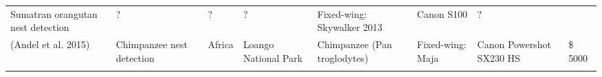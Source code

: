 \documentclass[]{interact}
\theoremstyle{plain}%
\theoremstyle{definition}
\theoremstyle{remark}
\begin{document}
\begin{longtable}[]{@{}llllllll@{}}
\begin{minipage}[t]{0.18\columnwidth}
Sumatran orangutan nest detection\strut
\end{minipage} & \begin{minipage}[t]{0.03\columnwidth}\raggedright\strut
?\strut
\end{minipage} & \begin{minipage}[t]{0.14\columnwidth}\raggedright\strut
?\strut
\end{minipage} & \begin{minipage}[t]{0.10\columnwidth}\raggedright\strut
?\strut
\end{minipage} & \begin{minipage}[t]{0.09\columnwidth}\raggedright\strut
Fixed-wing: Skywalker 2013\strut
\end{minipage} & \begin{minipage}[t]{0.11\columnwidth}\raggedright\strut
Canon S100\strut
\end{minipage} & \begin{minipage}[t]{0.01\columnwidth}\raggedright\strut
?\strut
\end{minipage}\tabularnewline
\begin{minipage}[t]{0.11\columnwidth}\raggedright\strut
(Andel et al. 2015)\strut
\end{minipage} & \begin{minipage}[t]{0.18\columnwidth}\raggedright\strut
Chimpanzee nest detection\strut
\end{minipage} & \begin{minipage}[t]{0.03\columnwidth}\raggedright\strut
Africa\strut
\end{minipage} & \begin{minipage}[t]{0.14\columnwidth}\raggedright\strut
Loango National Park\strut
\end{minipage} & \begin{minipage}[t]{0.10\columnwidth}\raggedright\strut
Chimpanzee (Pan troglodytes)\strut
\end{minipage} & \begin{minipage}[t]{0.09\columnwidth}\raggedright\strut
Fixed-wing: Maja\strut
\end{minipage} & \begin{minipage}[t]{0.11\columnwidth}\raggedright\strut
Canon Powershot SX230 HS\strut
\end{minipage} & \begin{minipage}[t]{0.01\columnwidth}\raggedright\strut
\$ 5000\strut
\end{minipage}\tabularnewline
\begin{minipage}[t]{0.11\columnwidth}\raggedright\strut

\end{minipage}
\end{longtable}
\end{document}
